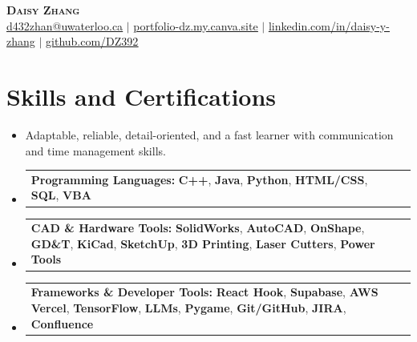 \documentclass[letterpaper,11pt]{article}
\makeatletter
\newcommand{\resumeItem}[1]{
  \item\small{{#1\vspace{-2pt}}}
}
\newcommand{\resumeSkillsHeading}[2]{
  \item
  \begin{tabular*}{0.97\textwidth}[t]{l@{\extracolsep{\fill}}r}
    \textbf{#1:} \small{#2} \\
  \end{tabular*}\vspace{-7pt}
}
\newcommand{\resumeSubHeadingListStart}{\begin{itemize}[leftmargin=0.15in, label={}]}
\newcommand{\resumeSubHeadingListEnd}{\end{itemize}}
\newcommand{\myemail}{d432zhan@uwaterloo.ca}
\newcommand{\myemail}{d432zhan@uwaterloo.ca}
\makeatother
\begin{document}
\begin{center}
    \textbf{\Huge \scshape Daisy Zhang} \\ \vspace{2pt}
    \small 
    \href{mailto:\myemail}{\underline{\myemail}} $|$ 
    \href{https://portfolio-dz.my.canva.site/}{\underline{portfolio-dz.my.canva.site}} $|$ 
    \href{https://linkedin.com/in/daisy-y-zhang}{\underline{linkedin.com/in/daisy-y-zhang}} $|$
    \href{https://github.com/DZ392}{\underline{github.com/DZ392}}
\end{center}


\section{Skills and Certifications}
    \resumeSubHeadingListStart
        \resumeItem{Adaptable, reliable, detail-oriented, and a fast learner with communication and time management skills.}
        \resumeSkillsHeading
            {Programming Languages}
            {\textbf{C++}, \textbf{Java}, \textbf{Python}, \textbf{HTML/CSS}, \textbf{SQL}, \textbf{VBA}}
        \resumeSkillsHeading
            {CAD \& Hardware Tools}
            {\textbf{SolidWorks}, \textbf{AutoCAD}, \textbf{OnShape}, \textbf{GD\&T}, \textbf{KiCad}, \textbf{SketchUp}, \textbf{3D Printing}, \textbf{Laser Cutters}, \textbf{Power Tools}}
        \resumeSkillsHeading
            {Frameworks \& Developer Tools}
            {\textbf{React Hook}, \textbf{Supabase}, \textbf{AWS Vercel}, \textbf{TensorFlow}, \textbf{LLMs}, \textbf{Pygame}, \textbf{Git/GitHub}, \textbf{JIRA}, \textbf{Confluence}}
    \resumeSubHeadingListEnd
    \vspace{-4pt}

\end{document}
